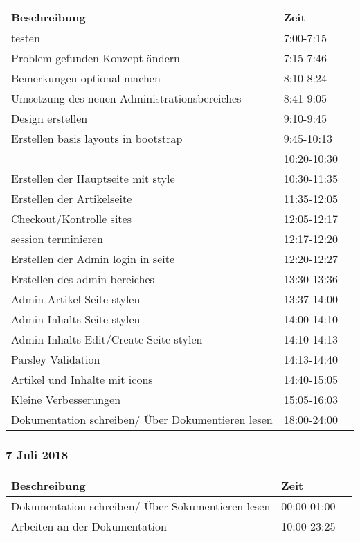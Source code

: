 \documentclass[a4paper, 11pt]{article}
\begin{document}
\begin{tabular}{llr}
\toprule
Beschreibung & Zeit \\
\midrule
testen & 7:00-7:15 \\
Problem gefunden Konzept ändern & 7:15-7:46 \\
Bemerkungen optional machen & 8:10-8:24 \\
Umsetzung des neuen Administrationsbereiches & 8:41-9:05 \\
Design erstellen & 9:10-9:45 \\
Erstellen basis layouts in bootstrap & 9:45-10:13 \\
 & 10:20-10:30 \\
Erstellen der Hauptseite mit style & 10:30-11:35 \\
Erstellen der Artikelseite & 11:35-12:05 \\
Checkout/Kontrolle sites & 12:05-12:17 \\
session terminieren & 12:17-12:20 \\
Erstellen der Admin login in seite & 12:20-12:27 \\
Erstellen des admin bereiches & 13:30-13:36 \\
Admin Artikel Seite stylen & 13:37-14:00 \\
Admin Inhalts Seite stylen & 14:00-14:10 \\
Admin Inhalts Edit/Create Seite stylen & 14:10-14:13 \\
Parsley Validation & 14:13-14:40 \\
Artikel und Inhalte mit icons & 14:40-15:05 \\
Kleine Verbesserungen & 15:05-16:03 \\
Dokumentation schreiben/ Über Dokumentieren lesen & 18:00-24:00 \\
\bottomrule
\end{tabular}

\subsubsection{7 Juli 2018}

\begin{tabular}{llr}
\toprule
Beschreibung & Zeit \\
\midrule
Dokumentation schreiben/ Über Sokumentieren lesen & 00:00-01:00 \\
Arbeiten an der Dokumentation & 10:00-23:25 \\
\bottomrule
\end{tabular}
\end{document}
